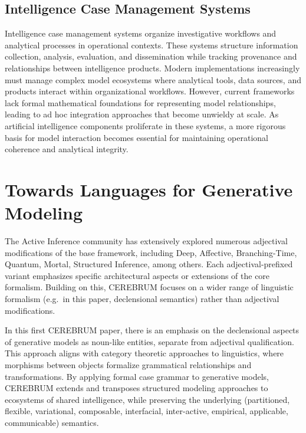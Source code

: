 \hypertarget{intelligence-case-management-systems}{%
\subsection{Intelligence Case Management
Systems}\label{intelligence-case-management-systems}}

Intelligence case management systems organize investigative workflows
and analytical processes in operational contexts. These systems
structure information collection, analysis, evaluation, and
dissemination while tracking provenance and relationships between
intelligence products. Modern implementations increasingly must manage
complex model ecosystems where analytical tools, data sources, and
products interact within organizational workflows. However, current
frameworks lack formal mathematical foundations for representing model
relationships, leading to ad hoc integration approaches that become
unwieldy at scale. As artificial intelligence components proliferate in
these systems, a more rigorous basis for model interaction becomes
essential for maintaining operational coherence and analytical
integrity.

\hypertarget{towards-languages-for-generative-modeling}{%
\section{Towards Languages for Generative
Modeling}\label{towards-languages-for-generative-modeling}}

The Active Inference community has extensively explored numerous
adjectival modifications of the base framework, including Deep,
Affective, Branching-Time, Quantum, Mortal, Structured Inference, among
others. Each adjectival-prefixed variant emphasizes specific
architectural aspects or extensions of the core formalism. Building on
this, CEREBRUM focuses on a wider range of linguistic formalism (e.g.~in
this paper, declensional semantics) rather than adjectival
modifications.

In this first CEREBRUM paper, there is an emphasis on the declensional
aspects of generative models as noun-like entities, separate from
adjectival qualification. This approach aligns with category theoretic
approaches to linguistics, where morphisms between objects formalize
grammatical relationships and transformations. By applying formal case
grammar to generative models, CEREBRUM extends and transposes structured
modeling approaches to ecosystems of shared intelligence, while
preserving the underlying (partitioned, flexible, variational,
composable, interfacial, inter-active, empirical, applicable,
communicable) semantics.

